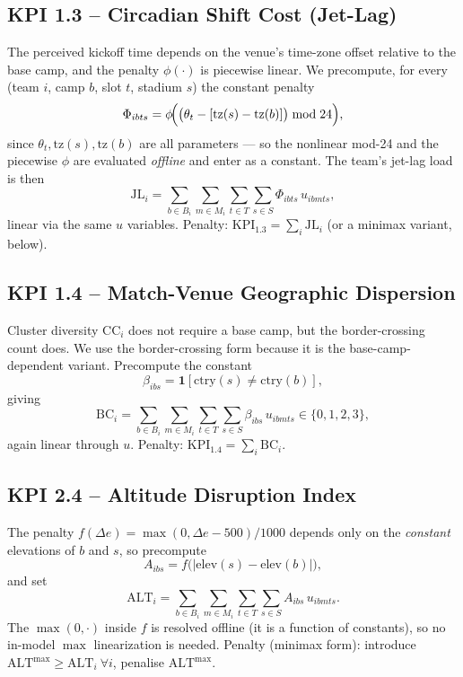 \documentclass[12pt, letterpaper]{article}
\begin{document}
\subsection{KPI 1.3 -- Circadian Shift Cost (Jet-Lag)}
The perceived kickoff time depends on the venue's time-zone offset
relative to the base camp, and the penalty $\phi(\cdot)$ is piecewise
linear. We precompute, for every (team $i$, camp $b$, slot $t$, stadium
$s$) the constant penalty
\begin{equation}
\Phi_{ibts}=\phi\!\Bigl(\bigl(\theta_t-[\mathrm{tz}(s)-\mathrm{tz}(b)]\bigr)\bmod 24\Bigr),
\end{equation}
since $\theta_t,\mathrm{tz}(s),\mathrm{tz}(b)$ are all parameters --- so the
nonlinear mod-24 and the piecewise $\phi$ are evaluated \emph{offline} and
enter as a constant. The team's jet-lag load is then
\begin{equation}
\mathrm{JL}_i=\sum_{b\in B_i}\sum_{m\in M_i}\sum_{t\in T}\sum_{s\in S}
  \Phi_{ibts}\,u_{ibmts},
\end{equation}
linear via the same $u$ variables. Penalty:
$\mathrm{KPI}_{1.3}=\sum_i \mathrm{JL}_i$ (or a minimax variant, below).

\subsection{KPI 1.4 -- Match-Venue Geographic Dispersion}
Cluster diversity $\mathrm{CC}_i$ does not require a base camp, but the
border-crossing count does. We use the border-crossing form because it is
the base-camp-dependent variant. Precompute the constant
\begin{equation}
\beta_{ibs}=\mathbf 1\!\left[\mathrm{ctry}(s)\neq\mathrm{ctry}(b)\right],
\end{equation}
giving
\begin{equation}
\mathrm{BC}_i=\sum_{b\in B_i}\sum_{m\in M_i}\sum_{t\in T}\sum_{s\in S}
  \beta_{ibs}\,u_{ibmts}\in\{0,1,2,3\},
\end{equation}
again linear through $u$. Penalty: $\mathrm{KPI}_{1.4}=\sum_i \mathrm{BC}_i$.

\subsection{KPI 2.4 -- Altitude Disruption Index}
The penalty $f(\Delta e)=\max(0,\Delta e-500)/1000$ depends only on the
\emph{constant} elevations of $b$ and $s$, so precompute
\begin{equation}
A_{ibs}=f\!\bigl(|\mathrm{elev}(s)-\mathrm{elev}(b)|\bigr),
\end{equation}
and set
\begin{equation}
\mathrm{ALT}_i=\sum_{b\in B_i}\sum_{m\in M_i}\sum_{t\in T}\sum_{s\in S}
  A_{ibs}\,u_{ibmts}.
\end{equation}
The $\max(0,\cdot)$ inside $f$ is resolved offline (it is a function of
constants), so no in-model $\max$ linearization is needed. Penalty
(minimax form): introduce $\mathrm{ALT}^{\max}\ge \mathrm{ALT}_i\ \forall
i$, penalise $\mathrm{ALT}^{\max}$.
\end{document}
